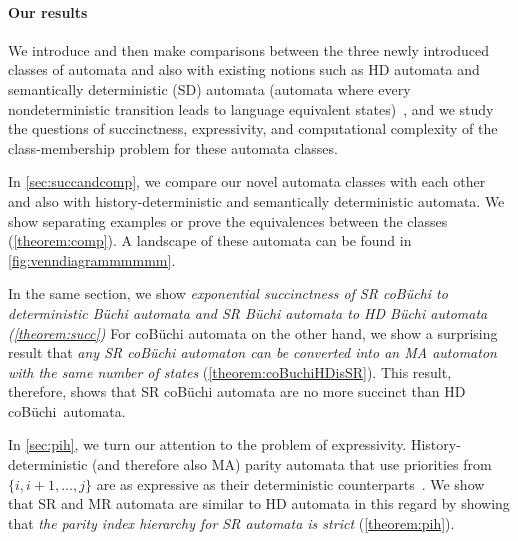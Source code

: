 \paragraph*{Our results}
We introduce and then make comparisons between the three newly introduced classes of automata and also with existing notions such as HD automata and semantically deterministic (SD) automata (automata where every nondeterministic transition leads to language equivalent states)~\cite{AK23}, and we study the questions of succinctness, expressivity, and computational complexity of the class-membership problem for these automata classes. 


In \cref{sec:succandcomp}, we compare our novel automata classes with each other and also with history-deterministic and semantically deterministic automata. We show separating examples or prove the equivalences between the classes (\cref{theorem:comp}). A landscape of these automata can be found in \cref{fig:venndiagrammmmmm}.

In the same section, we show \emph{exponential succinctness of SR coB\"uchi to deterministic B\"uchi automata and SR B\"uchi automata to HD B\"uchi automata (\cref{theorem:succ})} %
For coB\"uchi automata on the other hand, we show a surprising result that \emph{any SR coB\"uchi automaton can be converted into an MA automaton with the same number of states} (\cref{theorem:coBuchiHDisSR}). This result, therefore, shows that SR coB\"uchi automata are no more succinct than HD coB\"uchi~automata. %

In \cref{sec:pih}, we turn our attention to the problem of expressivity.  History-deterministic (and therefore also MA) parity automata that use priorities from $\{i,i+1,\dots,j\}$ are as expressive as their deterministic counterparts~\cite{BKS17}. We show that SR and MR automata are similar to HD automata in this regard by showing that \emph{the parity index hierarchy for SR automata is strict} (\cref{theorem:pih}). 

